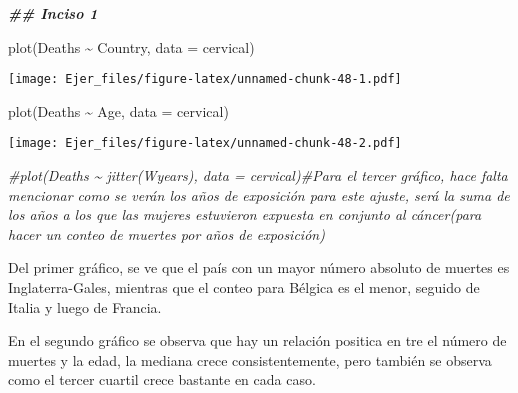 \documentclass[
]{article}
\newenvironment{Shaded}{\begin{snugshade}}{\end{snugshade}}
\newcommand{\AttributeTok}[1]{\textcolor[rgb]{0.77,0.63,0.00}{#1}}
\newcommand{\CommentTok}[1]{\textcolor[rgb]{0.56,0.35,0.01}{\textit{#1}}}
\newcommand{\DocumentationTok}[1]{\textcolor[rgb]{0.56,0.35,0.01}{\textbf{\textit{#1}}}}
\newcommand{\FunctionTok}[1]{\textcolor[rgb]{0.00,0.00,0.00}{#1}}
\newcommand{\NormalTok}[1]{#1}
\newcommand{\SpecialCharTok}[1]{\textcolor[rgb]{0.00,0.00,0.00}{#1}}
\begin{document}
\begin{Shaded}
\begin{Highlighting}[]
\DocumentationTok{\#\# Inciso 1}

\FunctionTok{plot}\NormalTok{(Deaths }\SpecialCharTok{\textasciitilde{}}\NormalTok{ Country, }\AttributeTok{data =}\NormalTok{ cervical)}
\end{Highlighting}
\end{Shaded}

\texttt{[image: Ejer\_files/figure-latex/unnamed-chunk-48-1.pdf]}

\begin{Shaded}
\begin{Highlighting}[]
\FunctionTok{plot}\NormalTok{(Deaths }\SpecialCharTok{\textasciitilde{}}\NormalTok{ Age, }\AttributeTok{data =}\NormalTok{ cervical)}
\end{Highlighting}
\end{Shaded}

\texttt{[image: Ejer\_files/figure-latex/unnamed-chunk-48-2.pdf]}

\begin{Shaded}
\begin{Highlighting}[]
\CommentTok{\#plot(Deaths \textasciitilde{} jitter(Wyears), data = cervical)\#Para el tercer gráfico, hace falta mencionar como se verán los años de exposición para este ajuste, será la suma de los años a los que las mujeres estuvieron expuesta en conjunto al cáncer(para hacer un conteo de muertes por años de exposición)}
\end{Highlighting}
\end{Shaded}

Del primer gráfico, se ve que el país con un mayor número absoluto de
muertes es Inglaterra-Gales, mientras que el conteo para Bélgica es el
menor, seguido de Italia y luego de Francia.

En el segundo gráfico se observa que hay un relación positica en tre el
número de muertes y la edad, la mediana crece consistentemente, pero
también se observa como el tercer cuartil crece bastante en cada caso.
\end{document}
